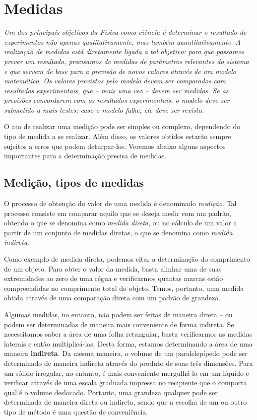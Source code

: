 \chapter{Medidas}
\label{Chap:Medidas}


{\it Um dos principais objetivos da Física como ciência é determinar o resultado de experimentos não apenas qualitativamente, mas também quantitativamente. A realização de medidas está diretamente ligada a tal objetivo: para que possamos prever um resultado, precisamos de medidas de parâmetros relevantes do sistema e que servem de base para a previsão de novos valores através de um modelo matemático. Os valores previstos pelo modelo devem ser comparados com resultados experimentais, que -- mais uma vez -- devem ser medidos. Se as previsões concordarem com os resultados experimentais, o modelo deve ser submetido a mais testes; caso o modelo falhe, ele deve ser revisto. 

 O ato de realizar uma medição pode ser simples ou complexo, dependendo do tipo de medida a se realizar. Além disso, os valores obtidos estarão sempre sujeitos a erros que podem deturpar-los. Veremos abaixo alguns aspectos importantes para a determinação precisa de medidas.}

\section{Medição, tipos de medidas}

O processo de obtenção do valor de uma medida é denominado \emph{medição}. Tal processo consiste em comparar aquilo que se deseja medir com um padrão, obtendo o que se denomina como \emph{medida direta}, ou no cálculo de um valor a partir de um conjunto de medidas diretas, o que se denomina como \emph{medida indireta}.

Como exemplo de medida direta, podemos citar a determinação do comprimento de um objeto. Para obter o valor da medida, basta alinhar uma de suas extremidades ao zero de uma régua e verificarmos quantas marcas estão compreendidas no comprimento total do objeto. Temos, portanto, uma medida obtida através de uma comparação direta com um padrão de grandeza.

Algumas medidas, no entanto, não podem ser feitas de maneira direta -- ou podem ser determinadas de maneira mais conveniente de forma indireta. Se necessitamos saber a área de uma folha retangular, basta verificarmos as medidas laterais e então multiplicá-las. Desta forma, estamos determinando a área de uma maneira \textbf{indireta}. Da mesma maneira, o volume de um paralelepípedo pode ser determinado de maneira indireta através do produto de suas três dimensões. Para um sólido irregular, no entanto, é mais conveniente mergulhá-lo em um líquido e verificar através de uma escala graduada impressa no recipiente que o comporta qual é o volume deslocado. Portanto, uma grandeza qualquer pode ser determinada de maneira direta ou indireta, sendo que a escolha de um ou outro tipo de método é uma questão de conveniência.

